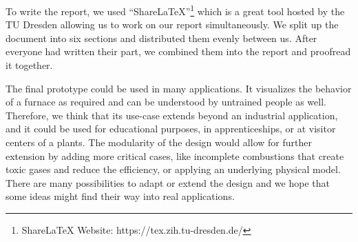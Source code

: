 To write the report, we used “ShareLaTeX”\footnote{ShareLaTeX Website: https://tex.zih.tu-dresden.de/} which is a great tool hosted by the TU Dresden allowing us to work on our report simultaneously. We split up the document into six sections and distributed them evenly between us. After everyone had written their part, we combined them into the report and proofread it together.

The final prototype could be used in many applications. It visualizes the behavior of a furnace as required and can be understood by untrained people as well. Therefore, we think that its use-case extends beyond an industrial application, and it could be used for educational purposes, in apprenticeships, or at visitor centers of a plants. The modularity of the design would allow for further extension by adding more critical cases, like incomplete combustions that create toxic gases and reduce the efficiency, or applying an underlying physical model. There are many possibilities to adapt or extend the design and we hope that some ideas might find their way into real applications.
